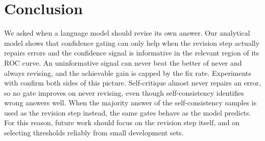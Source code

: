\section{Conclusion}
\label{sec:conclusion}

We asked when a language model should revise its own answer. Our analytical model shows that confidence gating can only help when the revision step actually repairs errors and the confidence signal is informative in the relevant region of its ROC curve. An uninformative signal can never beat the better of never and always revising, and the achievable gain is capped by the fix rate. Experiments with \modelA{} confirm both sides of this picture. Self-critique almost never repairs an error, so no gate improves on never revising, even though self-consistency identifies wrong answers well. When the majority answer of the self-consistency samples is used as the revision step instead, the same gates behave as the model predicts. For this reason, future work should focus on the revision step itself, and on selecting thresholds reliably from small development sets.
